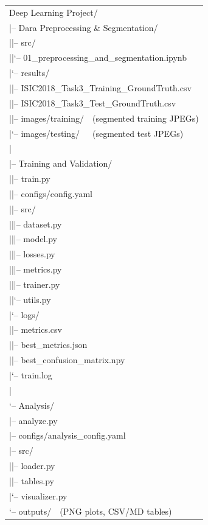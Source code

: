\documentclass[12pt,a4paper]{report}
\begin{document}
\begin{center}
\ttfamily\small
\begin{tabular}{@{}l@{}}
Deep Learning Project/\\
\quad|-- Dara Preprocessing \& Segmentation/\\
\quad|\quad\quad|-- src/\\
\quad|\quad\quad|\quad\quad`-- 01\_preprocessing\_and\_segmentation.ipynb\\
\quad|\quad\quad`-- results/\\
\quad|\quad\quad\quad\quad|-- ISIC2018\_Task3\_Training\_GroundTruth.csv\\
\quad|\quad\quad\quad\quad|-- ISIC2018\_Task3\_Test\_GroundTruth.csv\\
\quad|\quad\quad\quad\quad|-- images/training/\ \ (segmented training JPEGs)\\
\quad|\quad\quad\quad\quad`-- images/testing/\ \ \ (segmented test JPEGs)\\
\quad|\\
\quad|-- Training and Validation/\\
\quad|\quad\quad|-- train.py\\
\quad|\quad\quad|-- configs/config.yaml\\
\quad|\quad\quad|-- src/\\
\quad|\quad\quad|\quad\quad|-- dataset.py\\
\quad|\quad\quad|\quad\quad|-- model.py\\
\quad|\quad\quad|\quad\quad|-- losses.py\\
\quad|\quad\quad|\quad\quad|-- metrics.py\\
\quad|\quad\quad|\quad\quad|-- trainer.py\\
\quad|\quad\quad|\quad\quad`-- utils.py\\
\quad|\quad\quad`-- logs/\\
\quad|\quad\quad\quad\quad|-- metrics.csv\\
\quad|\quad\quad\quad\quad|-- best\_metrics.json\\
\quad|\quad\quad\quad\quad|-- best\_confusion\_matrix.npy\\
\quad|\quad\quad\quad\quad`-- train.log\\
\quad|\\
\quad`-- Analysis/\\
\quad\quad\quad\quad|-- analyze.py\\
\quad\quad\quad\quad|-- configs/analysis\_config.yaml\\
\quad\quad\quad\quad|-- src/\\
\quad\quad\quad\quad|\quad\quad|-- loader.py\\
\quad\quad\quad\quad|\quad\quad|-- tables.py\\
\quad\quad\quad\quad|\quad\quad`-- visualizer.py\\
\quad\quad\quad\quad`-- outputs/\ \ (PNG plots, CSV/MD tables)\\
\end{tabular}
\end{center}
\end{document}
